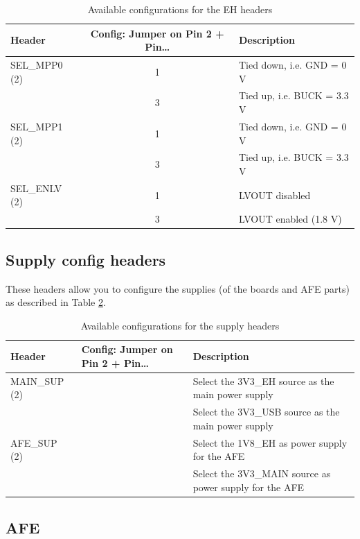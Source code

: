 \begin{table}[h!]
    \centering
    \begin{tabular}{l c l}
         \textbf{Header} & \textbf{Config: Jumper on Pin 2 + Pin\dots} & \textbf{Description} \\
         \toprule
         SEL\_MPP0 (2) & 1 & Tied down, i.e. GND = 0 V  \\
                       & 3 & Tied up, i.e. BUCK = 3.3 V \\
         SEL\_MPP1 (2) & 1 & Tied down, i.e. GND = 0 V  \\
                       & 3 & Tied up, i.e. BUCK = 3.3 V \\
         SEL\_ENLV (2) & 1 & LVOUT disabled \\
                       & 3 & LVOUT enabled (1.8 V)\\
    \end{tabular}
    \caption{Available configurations for the EH headers}
    \label{tab:EH-headers}
\end{table}

\subsection{Supply config headers}

These headers allow you to configure the supplies (of the boards and AFE parts) as described in Table \ref{tab:supply-headers}.

\begin{table}[h!]
    \centering
    \begin{tabular}{l >{\centering}p{8em} l}
         \textbf{Header} & \textbf{Config: Jumper on Pin 2 + Pin\dots} & \textbf{Description} \\
         \toprule
         MAIN\_SUP (2) & 1 & Select the 3V3\_EH source as the main power supply \\
                   & 3 & Select the 3V3\_USB source as the main power supply \\
         AFE\_SUP (2) & 1 & Select the 1V8\_EH as power supply for the AFE  \\
                   & 3 & Select the 3V3\_MAIN source as power supply for the AFE \\
    \end{tabular}
    \caption{Available configurations for the supply headers}
    \label{tab:supply-headers}
\end{table}

\subsection{AFE}


